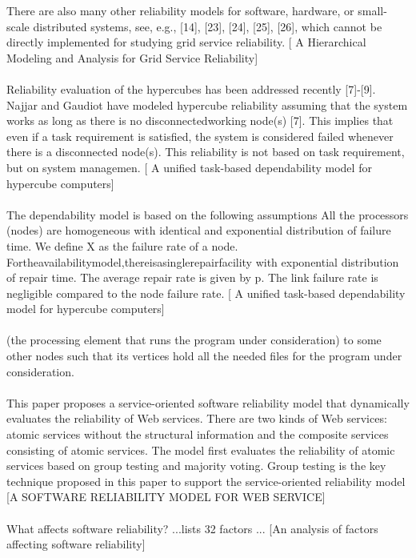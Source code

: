 \documentclass{cslthse-msc}
\begin{document}
There are also many other reliability models for software, hardware, or small-scale distributed systems, see, e.g., [14], [23], [24], [25], [26], which cannot be directly implemented for studying grid service reliability. [ A Hierarchical Modeling and Analysis for Grid Service Reliability]
\\\\
Reliability evaluation of the hypercubes has been addressed recently [7]-[9]. Najjar and Gaudiot have modeled hypercube reliability assuming that the system works as long as there is no disconnectedworking node(s) [7]. This implies that even if a task requirement is satisfied, the system is considered failed whenever there is a disconnected node(s). This reliability is not based on task requirement, but on system managemen.  [ A unified task-based dependability model for hypercube computers]
\\\\
The dependability model is based on the following assumptions All the processors (nodes) are homogeneous with identical and exponential distribution of failure time. We define X as the failure rate of a node. Fortheavailabilitymodel,thereisasinglerepairfacility with exponential distribution of repair time. The average repair rate is given by p.
The link failure rate is negligible compared to the node failure rate. [ A unified task-based dependability model for hypercube computers]
\\\\
(the processing element that runs the program under consideration) to some other nodes such that its vertices hold all the needed files for the program under consideration. \cite{Reliability analysis of distributed systems based on a fast reliability algorithm}
\\\\
This paper proposes a service-oriented software reliability model that dynamically evaluates the reliability of Web services. There are two kinds of Web services: atomic services without the structural information and the composite services consisting of atomic services. The model first evaluates the reliability of atomic services based on group testing and majority voting. Group testing is the key technique proposed in this paper to support the service-oriented reliability model [A SOFTWARE RELIABILITY MODEL FOR WEB SERVICE]
\\\\
What affects software reliability? ...lists 32 factors ... [An analysis of factors affecting software reliability]
\end{document}
